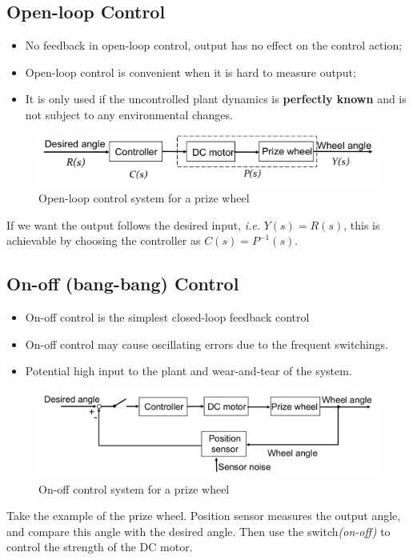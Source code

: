 \documentclass[12pt,a4paper]{article}
\begin{document}
\subsection{Open-loop Control} 
\begin{itemize}
\item No feedback in open-loop control, output has no effect on the control action;
\item Open-loop control is convenient when it is hard to measure output;
\item It is only used if the uncontrolled plant dynamics is \textbf{perfectly known} and is not subject to any environmental changes.
\end{itemize}
\begin{figure}[H] \centering 
\includegraphics[width=.7\textwidth]{images/open-loop.pdf}
\caption{Open-loop control system for a prize wheel}
\end{figure}
If we want the output follows the desired input, \textit{i.e.} $Y(s)=R(s)$, this is achievable by choosing the controller as $C(s) = P^{-1}(s)$.

\subsection{On-off (bang-bang) Control}
\begin{itemize}
\item On-off control is the simplest closed-loop feedback control
\item On-off control may cause oscillating errors due to the frequent switchings.
\item Potential high input to the plant and wear-and-tear of the system.
\end{itemize}

\begin{figure}[H] \centering 
\includegraphics[width=.7\textwidth]{images/onoff.pdf}
\caption{On-off control system for a prize wheel}
\end{figure}
Take the example of the prize wheel. Position sensor measures the output angle, and compare this angle with the desired angle. Then use the switch\textit{(on-off)} to control the strength of the DC motor.
\end{document}
